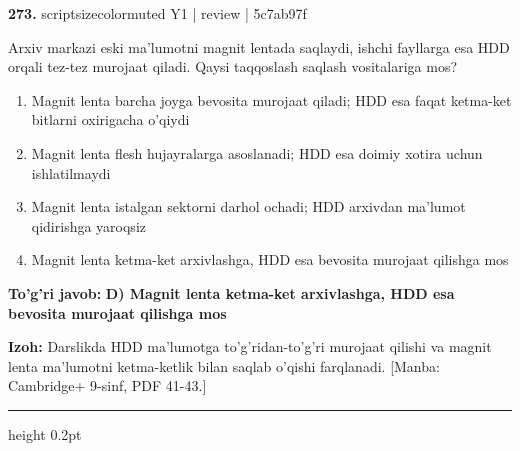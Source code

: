 \documentclass[10pt,a4paper]{article}
\begin{document}
{\bfseries\sffamily\color{ink} 273.} {scriptsizecolor{muted} Y1 | review | 5c7ab97f}
\par
Arxiv markazi eski ma'lumotni magnit lentada saqlaydi, ishchi fayllarga esa HDD orqali tez-tez murojaat qiladi. Qaysi taqqoslash saqlash vositalariga mos?
\begin{enumerate}[label=\Alph*),leftmargin=9mm]
\item Magnit lenta barcha joyga bevosita murojaat qiladi; HDD esa faqat ketma-ket bitlarni oxirigacha o'qiydi
\item Magnit lenta flesh hujayralarga asoslanadi; HDD esa doimiy xotira uchun ishlatilmaydi
\item Magnit lenta istalgan sektorni darhol ochadi; HDD arxivdan ma'lumot qidirishga yaroqsiz
\item Magnit lenta ketma-ket arxivlashga, HDD esa bevosita murojaat qilishga mos
\end{enumerate}
\begin{tcolorbox}[enhanced,breakable,colback=teal!4,colframe=teal!60!black,boxrule=0.45pt,arc=1.2mm,left=2.7mm,right=2.7mm,top=1.8mm,bottom=1.8mm,before skip=2mm,after skip=2mm]
{\bfseries\sffamily\color{teal}To'g'ri javob:} \textbf{D) Magnit lenta ketma-ket arxivlashga, HDD esa bevosita murojaat qilishga mos}
\par\smallskip
{\bfseries Izoh:} Darslikda HDD ma'lumotga to'g'ridan-to'g'ri murojaat qilishi va magnit lenta ma'lumotni ketma-ketlik bilan saqlab o'qishi farqlanadi. [Manba: Cambridge+ 9-sinf, PDF 41-43.]
\end{tcolorbox}
\vspace{2mm}\hrule height 0.2pt\vspace{3mm}
\end{document}

